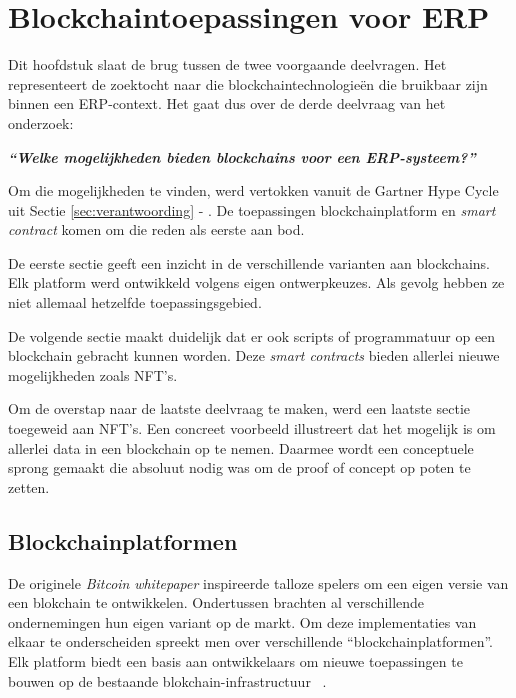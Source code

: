 \chapter{Blockchaintoepassingen voor ERP}
\label{ch:blockchaintoepassingen-voor-erp}

Dit hoofdstuk slaat de brug tussen de twee voorgaande deelvragen. Het representeert de zoektocht naar die blockchaintechnologieën die bruikbaar zijn binnen een ERP-context. Het gaat dus over de derde deelvraag van het onderzoek:

\begin{center}
	\textit{\textbf{``Welke mogelijkheden bieden blockchains voor een ERP-systeem?''}}
\end{center}

Om die mogelijkheden te vinden, werd vertokken vanuit de Gartner Hype Cycle uit Sectie \ref{sec:verantwoording} - . De toepassingen blockchainplatform en \textit{smart contract} komen om die reden als eerste aan bod.

De eerste sectie geeft een inzicht in de verschillende varianten aan blockchains. Elk platform werd ontwikkeld volgens eigen ontwerpkeuzes. Als gevolg hebben ze niet allemaal hetzelfde toepassingsgebied.

De volgende sectie maakt duidelijk dat er ook scripts of programmatuur op een blockchain gebracht kunnen worden. Deze \textit{smart contracts} bieden allerlei nieuwe mogelijkheden zoals NFT's. 

Om de overstap naar de laatste deelvraag te maken, werd een laatste sectie toegeweid aan NFT's. Een concreet voorbeeld illustreert dat het mogelijk is om allerlei data in een blockchain op te nemen. Daarmee wordt een conceptuele sprong gemaakt die absoluut nodig was om de proof of concept op poten te zetten.

\section{Blockchainplatformen}

De originele \textit{Bitcoin} \textit{whitepaper} inspireerde talloze spelers om een eigen versie van een blokchain te ontwikkelen. Ondertussen brachten al verschillende ondernemingen hun eigen variant op de markt. Om deze implementaties van elkaar te onderscheiden spreekt men over verschillende ``blockchainplatformen''. Elk platform biedt een basis aan ontwikkelaars om nieuwe toepassingen te bouwen op de bestaande blokchain-infrastructuur
~\autocite{Saraf2018}.

